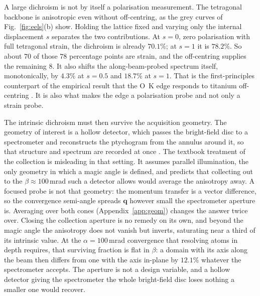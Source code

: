 \documentclass[aps,prb,twocolumn,superscriptaddress,floatfix,nofootinbib]{revtex4-2}
\begin{document}
A large dichroism is not by itself a polarisation measurement. The tetragonal backbone is anisotropic even without off-centring, as the grey curves of Fig.~\ref{fig:eels}(b) show. Holding the lattice fixed and varying only the internal displacement $s$ separates the two contributions. At $s=0$, zero polarisation with full tetragonal strain, the dichroism is already $70.1\%$; at $s=1$ it is $78.2\%$. So about $70$ of those $78$ percentage points are strain, and the off-centring supplies the remaining $8$. It also shifts the along-beam-probed spectrum itself, monotonically, by $4.3\%$ at $s=0.5$ and $18.7\%$ at $s=1$. That is the first-principles counterpart of the empirical result that the O~K edge responds to titanium off-centring \citep{Bugnet2016}. It is also what makes the edge a polarisation probe and not only a strain probe.

The intrinsic dichroism must then survive the acquisition geometry. The geometry of interest is a hollow detector, which passes the bright-field disc to a spectrometer and reconstructs the ptychogram from the annulus around it, so that structure and spectrum are recorded at once \citep{LeiWang2026}. The textbook treatment of the collection is misleading in that setting. It assumes parallel illumination, the only geometry in which a magic angle is defined, and predicts that collecting out to the $\beta\approx100$\,mrad such a detector allows would average the anisotropy away. A focused probe is not that geometry: the momentum transfer is a vector difference, so the convergence semi-angle spreads $\mathbf{q}$ however small the spectrometer aperture is. Averaging over both cones (Appendix~\ref{app:geom}) changes the answer twice over. Closing the collection aperture is no remedy on its own, and beyond the magic angle the anisotropy does not vanish but inverts, saturating near a third of its intrinsic value. At the $\alpha=100$\,mrad convergence that resolving atoms in depth requires, that surviving fraction is flat in $\beta$: a domain with its axis along the beam then differs from one with the axis in-plane by $12.1\%$ whatever the spectrometer accepts. The aperture is not a design variable, and a hollow detector giving the spectrometer the whole bright-field disc loses nothing a smaller one would recover.
\end{document}
